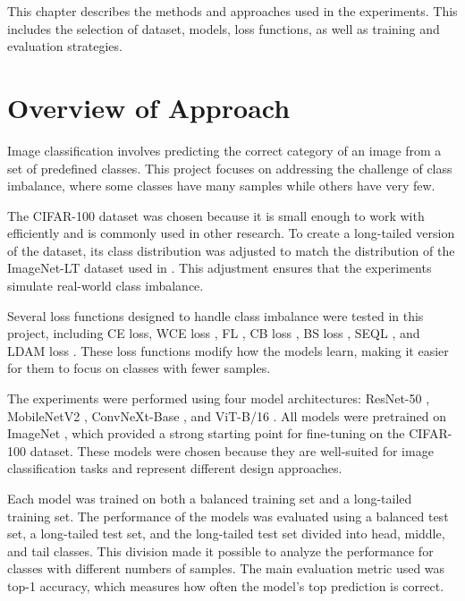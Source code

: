 
This chapter describes the methods and approaches used in the experiments. This includes the selection of dataset, models, loss functions, as well as training and evaluation strategies.

\section{Overview of Approach}

Image classification involves predicting the correct category of an image from a set of predefined classes. This project focuses on addressing the challenge of class imbalance, where some classes have many samples while others have very few.

The CIFAR-100 dataset \cite{krizhevsky2009learning} was chosen because it is small enough to work with efficiently and is commonly used in other research. To create a long-tailed version of the dataset, its class distribution was adjusted to match the distribution of the ImageNet-LT dataset used in \cite{zhang2023deep}. This adjustment ensures that the experiments simulate real-world class imbalance.

Several loss functions designed to handle class imbalance were tested in this project, including CE loss, WCE loss \cite{zhang2023deep}, FL \cite{lin2018focallossdenseobject}, CB loss \cite{cui2019classbalancedlossbasedeffective}, BS loss \cite{ren2020balancedmetasoftmaxlongtailedvisual}, SEQL \cite{tan2020equalizationlosslongtailedobject}, and LDAM loss \cite{cao2019learningimbalanceddatasetslabeldistributionaware}. These loss functions modify how the models learn, making it easier for them to focus on classes with fewer samples.

The experiments were performed using four model architectures: ResNet-50 \cite{he2015deepresiduallearningimage}, MobileNetV2 \cite{sandler2018mobilenetv2}, ConvNeXt-Base \cite{liu2022convnet2020s}, and ViT-B/16 \cite{dosovitskiy2021imageworth16x16words}. All models were pretrained on ImageNet \cite{ImageNet2009}, which provided a strong starting point for fine-tuning on the CIFAR-100 dataset. These models were chosen because they are well-suited for image classification tasks and represent different design approaches.

Each model was trained on both a balanced training set and a long-tailed training set. The performance of the models was evaluated using a balanced test set, a long-tailed test set, and the long-tailed test set divided into head, middle, and tail classes. This division made it possible to analyze the performance for classes with different numbers of samples. The main evaluation metric used was top-1 accuracy, which measures how often the model's top prediction is correct.

